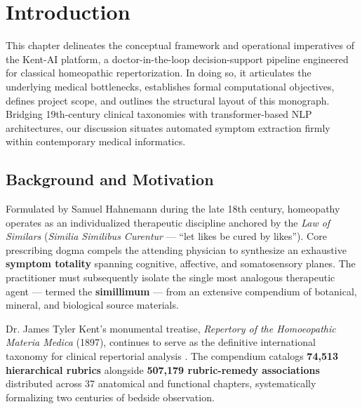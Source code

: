 
\chapter{Introduction}
\label{Chapter1}

\newcommand{\keyword}[1]{\textbf{#1}}
\newcommand{\code}[1]{\texttt{#1}}
\newcommand{\file}[1]{\texttt{\bfseries#1}}
\newcommand{\option}[1]{\texttt{\itshape#1}}

This chapter delineates the conceptual framework and operational imperatives of the Kent-AI platform, a doctor-in-the-loop decision-support pipeline engineered for classical homeopathic repertorization. In doing so, it articulates the underlying medical bottlenecks, establishes formal computational objectives, defines project scope, and outlines the structural layout of this monograph. Bridging 19th-century clinical taxonomies with transformer-based NLP architectures, our discussion situates automated symptom extraction firmly within contemporary medical informatics.


\section{Background and Motivation}

Formulated by Samuel Hahnemann during the late 18th century, homeopathy operates as an individualized therapeutic discipline anchored by the \textit{Law of Similars} (\textit{Similia Similibus Curentur} --- ``let likes be cured by likes''). Core prescribing dogma compels the attending physician to synthesize an exhaustive \keyword{symptom totality} spanning cognitive, affective, and somatosensory planes. The practitioner must subsequently isolate the single most analogous therapeutic agent --- termed the \keyword{simillimum} --- from an extensive compendium of botanical, mineral, and biological source materials.

Dr. James Tyler Kent's monumental treatise, \textit{Repertory of the Homoeopathic Materia Medica} (1897), continues to serve as the definitive international taxonomy for clinical repertorial analysis \cite{kent1897}. The compendium catalogs \textbf{74,513 hierarchical rubrics} alongside \textbf{507,179 rubric-remedy associations} distributed across 37 anatomical and functional chapters, systematically formalizing two centuries of bedside observation.

